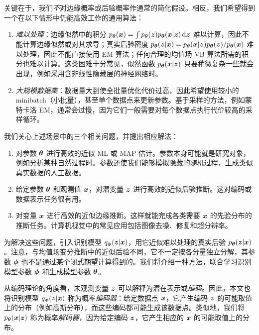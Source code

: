 关键在于，我们\emph{不}对边缘概率或后验概率作通常的简化假设。相反，我们希望得到一个在以下情形中仍能高效工作的通用算法：
\begin{enumerate}
\item \emph{难以处理}：边缘似然中的积分 $p_{\bm{\theta}}(\bm{x}) = \int p_{\bm{\theta}}(\bm{z}) p_{\bm{\theta}}(\bm{x}|\bm{z})\,\mathrm{d}\bm{z}$ 难以计算，因此不能计算边缘似然或对其求导；真实后验密度 $p_{\bm{\theta}}(\bm{z}|\bm{x}) = p_{\bm{\theta}}(\bm{x}|\bm{z})p_{\bm{\theta}}(\bm{z})/p_{\bm{\theta}}(\bm{x})$ 难以处理，因此不能直接使用 EM 算法；任何合理的均值场 VB 算法所需的积分也难以计算。这类困难十分常见，似然函数 $p_{\bm{\theta}}(\bm{x}|\bm{z})$ 只要稍微复杂一些就会出现，例如采用含非线性隐藏层的神经网络时。
\item \emph{大规模数据集}：数据量大到使全批量优化代价过高，因此希望使用较小的 minibatch（小批量），甚至单个数据点来更新参数。基于采样的方法，例如蒙特卡洛 EM，通常会过慢，因为它们一般需要对每个数据点执行代价较高的采样循环。
\end{enumerate}

我们关心上述场景中的三个相关问题，并提出相应解法：
\begin{enumerate}
\item 对参数 $\bm{\theta}$ 进行高效的近似 ML 或 MAP 估计。参数本身可能就是研究对象，例如分析某种自然过程时。参数还使我们能够模拟隐藏的随机过程，生成类似真实数据的人工数据。
\item 给定参数 $\bm{\theta}$ 和观测值 $\bm{x}$，对潜变量 $\bm{z}$ 进行高效的近似后验推断。这对编码或数据表示任务很有用。
\item 对变量 $\bm{x}$ 进行高效的近似边缘推断。这样就能完成各类需要 $\bm{x}$ 的先验分布的推断任务。计算机视觉中的常见应用包括图像去噪、修复和超分辨率。
\end{enumerate}

为解决这些问题，引入识别模型 $q_{\bm{\phi}}(\bm{z}|\bm{x})$，用它近似难以处理的真实后验 $p_{\bm{\theta}}(\bm{z}|\bm{x})$。注意，与均值场变分推断中的近似后验不同，它不一定按各分量独立分解，其参数 $\bm{\phi}$ 也不是通过某个闭式期望计算得到的。我们将介绍一种方法，联合学习识别模型参数 $\bm{\phi}$ 和生成模型参数 $\bm{\theta}$。


从编码理论的角度看，未观测变量 $\bm{z}$ 可以解释为潜在表示或\emph{编码}。因此，本文也将识别模型 $q_{\bm{\phi}}(\bm{z}|\bm{x})$ 称为概率\emph{编码器}：给定数据点 $\bm{x}$，它产生编码 $\bm{z}$ 的可能取值上的分布（例如高斯分布），而这些编码都可能生成该数据点。类似地，我们将 $p_{\bm{\theta}}(\bm{x}|\bm{z})$ 称为概率\emph{解码器}，因为给定编码 $\bm{z}$，它产生相应的 $\bm{x}$ 的可能取值上的分布。

